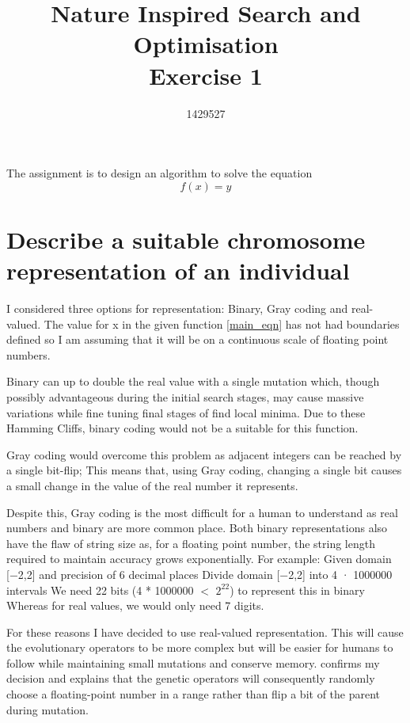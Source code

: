 \documentclass{article}
\begin{document}
\title{%
  Nature Inspired Search and Optimisation  \\
  \large Exercise 1 \\
    }

\author{1429527}

\maketitle

The assignment is to design an algorithm to solve the equation 
\begin{equation} \label{main_eqn}
f(x)=y
\end{equation}


\section{Describe a suitable chromosome representation of an individual}

I considered three options for representation: Binary, Gray coding and real-valued. The value for x in the given function \ref{main_eqn} has not had boundaries defined so I am assuming that it will be on a continuous scale of floating point numbers.  

Binary can up to double the real value with a single mutation which, though possibly advantageous during the initial search stages, may cause massive variations while fine tuning final stages of find local minima. Due to these Hamming Cliffs, binary coding would not be a suitable for this function. 

Gray coding would overcome this problem as adjacent integers can be reached by a single bit-flip; This means that, using Gray coding, changing a single bit causes a small change in the value of the real number it represents.

Despite this, Gray coding is the most difficult for a human to understand as real numbers and binary are more common place. Both binary representations also have the flaw of string size as, for a floating point number, the string length required to maintain accuracy grows exponentially. For example:
\smallbreak
Given domain [−2,2] and precision of 6 decimal places
 \smallbreak
Divide domain [−2,2] into 4 · 1000000 intervals
\smallbreak
 We need 22 bits (4 * 1000000 $<$ $2^{22}$) to represent this in binary
\smallbreak
Whereas for real values, we would only need 7 digits.

For these reasons I have decided to use real-valued representation. This will cause the evolutionary operators to be more complex but will be easier for humans to follow while maintaining small mutations and conserve memory. \cite{floating-point} confirms my decision and explains that the genetic operators will consequently randomly choose a floating-point number in a range rather than flip a bit of the parent during mutation. 
\end{document}
